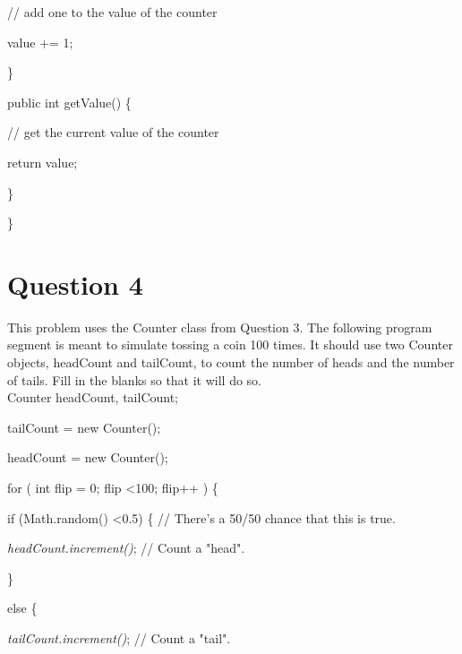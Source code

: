 \documentclass[11pt, oneside]{article}   	%
\begin{document}
	                   \hspace{10ex} // add one to the value of the counter
	                    
	              \hspace{8ex} value += 1;
	               
	           \hspace{4ex} \}
	
	           \hspace{4ex} public int getValue() \{   
	             
	                  \hspace{10ex} // get the current value of the counter
	                   
	              \hspace{8ex} return value;
	               
	           \hspace{4ex} \}
	
	         \}

\section*{Question 4}
\par
This problem uses the Counter class from Question 3. The following program segment is meant to simulate tossing a coin 100 times. It should use two Counter objects, headCount and tailCount, to count the number of heads and the number of tails. Fill in the blanks so that it will do so.\\ 

Counter headCount, tailCount;

tailCount = new Counter();

headCount = new Counter();

for ( int flip = 0;  flip \textless 100;  flip++ ) \{

\hspace{4ex} if (Math.random() \textless 0.5) \{   // There's a 50/50 chance that this is true.
             
\hspace{8ex} \textit{headCount.increment()};   // Count a "head".

\hspace{4ex} \}
                 
\hspace{4ex} else \{
             
\hspace{8ex} \textit{tailCount.increment()};   // Count a "tail".
                 
\end{document}
